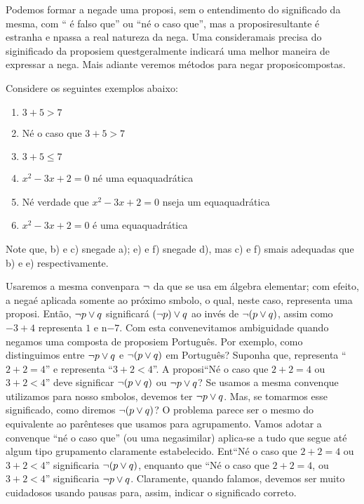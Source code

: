 Podemos formar a nega\cao de uma proposi\caoi, sem o entendimento do significado da mesma, com `` \'e falso que'' ou ``n\ao \'e o caso que'', mas a proposi\cao resultante \'e estranha e n\ao passa a real natureza da nega\caoi. Uma considera\cao mais precisa do siginificado da proposi\cao em quest\ao geralmente indicar\'a uma melhor maneira de expressar a nega\caoi. Mais adiante veremos métodos para negar proposi\coes compostas.

Considere os seguintes exemplos abaixo:
\begin{enumerate}[{\bf a)}]
\item $3+5 > 7$
\item N\ao \'e o caso que $3+5 > 7$
\item $3+5 \leq 7$
\item $x^2-3x+2=0$ n\ao \'e uma equa\cao quadr\'atica
\item N\ao \'e verdade que $x^2-3x+2=0$ n\ao seja um equa\cao quadr\'atica
\item $x^2-3x+2=0$ \'e uma equa\cao quadr\'atica  
\end{enumerate}
Note que, b) e c) s\ao nega\coes de a); e) e f) s\ao nega\coes de d), mas c) e f) s\ao mais adequadas que b) e e) respectivamente.

Usaremos a mesma conven\cao para $\lnot$ da que se usa em álgebra elementar; com efeito, a nega\cao \'e aplicada somente ao pr\'oximo s\ih mbolo, o qual, neste caso, representa uma proposi\caoi. Ent\~ao, $\lnot p \vee q$ significar\'a $(\lnot p) \vee q$ ao inv\'es de $\lnot (p \vee q)$, assim como $-3+4$ representa $1$ e n\ao $-7$. Com esta conven\cao evitamos ambiguidade quando negamos uma composta de proposi\coes em Portugu\^es. Por exemplo, como distinguimos entre $\lnot p \vee q$ e $\lnot (p \vee q)$ em Portugu\^es? Suponha que, \pp representa ``$2+2=4$'' e \qq representa ``$3+2<4$''. A proposi\cao ``N\ao \'e o caso que $2+2=4$ ou $3+2<4$'' deve significar $\lnot(p \vee q)$ ou $\lnot p \vee q$? Se usamos a mesma conven\cao que utilizamos para nosso s\ih mbolos, devemos ter $\lnot p \vee q$. Mas, se tomarmos esse significado, como diremos $\lnot (p \vee q)$? O problema parece ser o mesmo do equivalente ao par\^enteses que usamos para agrupamento. Vamos adotar a conven\cao que ``n\ao \'e o caso que'' (ou uma nega\cao similar) aplica-se a tudo que segue at\'e algum tipo grupamento claramente estabelecido. Ent\ao ``N\ao \'e o caso que $2+2=4$ ou $3+2<4$'' significaria $\lnot (p \vee q)$, enquanto que ``N\ao \'e o caso que $2+2=4$, ou $3+2<4$'' significaria $\lnot p \vee q$. Claramente, quando falamos, devemos ser muito cuidadosos usando pausas para, assim, indicar o significado correto.  

